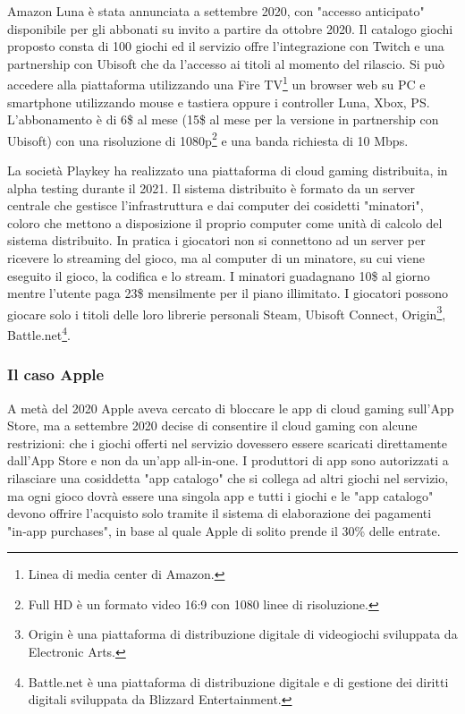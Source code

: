 Amazon Luna è stata annunciata a settembre 2020, con "accesso anticipato" disponibile per gli abbonati su invito a partire da ottobre 2020. Il catalogo giochi proposto consta di 100 giochi ed il servizio offre l'integrazione con Twitch e una partnership con Ubisoft che da l'accesso ai titoli al momento del rilascio. Si può accedere alla piattaforma utilizzando una Fire TV\footnote{Linea di media center di Amazon.} un browser web su PC e smartphone utilizzando mouse e tastiera oppure i controller Luna, Xbox, PS. L'abbonamento è di 6\$ al mese (15\$ al mese per la versione in partnership con Ubisoft) con una risoluzione di 1080p\footnote{Full HD è un formato video 16:9 con 1080 linee di risoluzione.} e una banda richiesta di 10 Mbps\cite{Amazon_Luna}.

La società Playkey ha realizzato una piattaforma di cloud gaming distribuita, in alpha testing durante il 2021. Il sistema distribuito è formato da un server centrale che gestisce l'infrastruttura e dai computer dei cosidetti "minatori", coloro che mettono a disposizione il proprio computer come unità di calcolo del sistema distribuito. In pratica i giocatori non si connettono ad un server per ricevere lo streaming del gioco, ma al computer di un minatore, su cui viene eseguito il gioco, la codifica e lo stream. I minatori guadagnano 10\$ al giorno mentre l'utente paga 23\$ mensilmente per il piano illimitato. I giocatori possono giocare solo i titoli delle loro librerie personali Steam, Ubisoft Connect, Origin\footnote{Origin è una piattaforma di distribuzione digitale di videogiochi sviluppata da Electronic Arts.}, Battle.net\footnote{Battle.net è una piattaforma di distribuzione digitale e di gestione dei diritti digitali sviluppata da Blizzard Entertainment.}\cite{Playkey}.


\subsubsection{Il caso Apple}
A metà del 2020 Apple aveva cercato di bloccare le app di cloud gaming sull'App Store, ma a settembre 2020 decise di consentire il cloud gaming con alcune restrizioni: che i giochi offerti nel servizio dovessero essere scaricati direttamente dall'App Store e non da un'app all-in-one. I produttori di app sono autorizzati a rilasciare una cosiddetta "app catalogo" che si collega ad altri giochi nel servizio, ma ogni gioco dovrà essere una singola app e tutti i giochi e le "app catalogo" devono offrire l'acquisto solo tramite il sistema di elaborazione dei pagamenti "in‑app purchases", in base al quale Apple di solito prende il 30\% delle entrate\cite{Apple_controversy}.